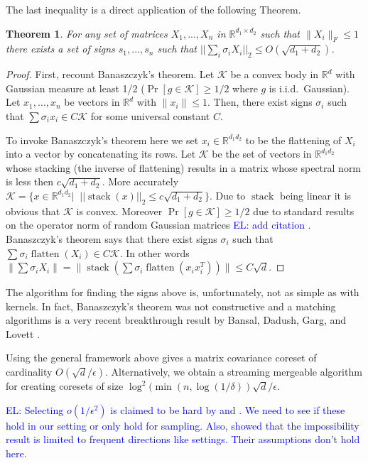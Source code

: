\documentclass{article} %
\newtheorem{theorem}{Theorem}[section]
\newcommand{\el}[1]{\textcolor{blue}{EL: #1}}
\newcommand{\R}{\mathbb{R}}
\newcommand{\eps}{\epsilon}
\begin{document}
\noindent The last inequality is a direct application of the following Theorem.
\begin{theorem}\label{BansalInDaHouz}
For any set of matrices $X_1,...,X_n$ in $\R^{d_1 \times d_2}$ such that $\|X_i\|_{F} \le 1$ there exists a set of signs $s_1,...,s_n$ such that $||\sum_i \sigma_i X_i||_{2} \le O(\sqrt{d_1 + d_2})$.
\end{theorem}
\begin{proof}
First, recount Banaszczyk's theorem. 
Let $\mathcal K$ be a convex body in $\R^d$ with Gaussian measure at least 1/2 ($\Pr[g \in \mathcal K] \ge 1/2$ where $g$ is i.i.d.\ Gaussian).
Let $x_1,\ldots,x_n$ be vectors in $\R^d$ with $\|x_i\| \le 1$. 
Then, there exist signs $\sigma_i$ such that $\sum \sigma_i x_i \in C \mathcal K$ for some universal constant $C$.

To invoke Banaszczyk's theorem here we set $x_i \in \R^{d_1d_2}$ to be the flattening of $X_i$ into a vector by concatenating its rows. 
Let $\mathcal K$ be the set of vectors in $\R^{d_1d_2}$ whose stacking (the inverse of flattening) results in a matrix whose spectral norm is less then $c\sqrt{d_1 + d_2}$.
More accurately $\mathcal K = \{x  \in \R^{d_1d_2} |\;\; ||\operatorname{stack}(x)||_2 \le c\sqrt{d_1+d_2}\}$. 
Due to $\operatorname{stack}$ being linear it is obvious that $\mathcal K$ is convex. 
Moreover $\Pr[g \in \mathcal K] \ge 1/2$ due to standard results on the operator norm of random Gaussian matrices \el{add citation \cite{}}.
Banaszczyk's theorem says that there exist signs $\sigma_i$ such that $\sum \sigma_i \operatorname{flatten}(X_i) \in C \mathcal K$.
In other words $\| \sum \sigma_i X_i\| = \| \operatorname{stack}( \sum \sigma_i \operatorname{flatten}(x_i x_i^T)) \| \le C \sqrt{d}$. 
\end{proof}
The algorithm for finding the signs above is, unfortunately, not as simple as with kernels. 
In fact, Banaszczyk's theorem was not constructive and a matching algorithms is a very recent breakthrough result by Bansal, Dadush, Garg, and Lovett \cite{DBLP:conf/stoc/BansalDGL18}.

Using the general framework above gives a matrix covariance coreset of cardinality $O(\sqrt{d}/\eps)$.
Alternatively, we obtain a streaming mergeable algorithm for creating coresets of size $\log^{2}(\min(n, \log(1/\delta)) \sqrt{d}/\eps$.



\el{Selecting $o(1/\eps^2)$ is claimed to be hard by \cite{DBLP:conf/focs/DeshpandeR10} and \cite{DBLP:conf/soda/DeshpandeRVW06}. We need to see if these hold in our setting or only hold for sampling.  Also, \cite{DBLP:conf/soda/GhashamiP14} showed that the impossibility result is limited to frequent directions like settings. Their assumptions don't hold here.} 
\end{document}

